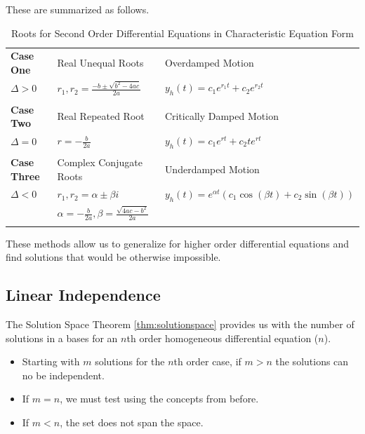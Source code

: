     These are summarized as follows.

        \begin{table}[ht]
            \centering
            \begin{tabular}{| l | l | l |}
                \hline
                \textbf{Case One} & Real Unequal Roots & Overdamped Motion\\
                $\Delta > 0$ & $r_1, r_2 = \frac{-b \pm \sqrt{b^2 - 4ac} }{2a}$ & $y_h(t) = c_1 e^{r_1 t} + c_2 e^{r_2 t}$\\&&\\
                \hline
                \textbf{Case Two} & Real Repeated Root & Critically Damped Motion\\
                $\Delta = 0$ & $r = - \frac{b}{2a} $ & $y_h(t) = c_1 e^{r t} + c_2 t e^{r t}$\\&&\\
                \hline
                \textbf{Case Three} & Complex Conjugate Roots & Underdamped Motion\\
                $\Delta < 0$ & $r_1, r_2 = \alpha \pm \beta i$ & $y_h(t) = e^{\alpha t} \left( c_1 \cos \left(\beta t \right) + c_2 \sin \left( \beta t \right) \right)$\\
                & $\alpha = - \frac{b}{2a}, \beta = \frac{\sqrt{4ac - b^2} }{2a}$ &\\&&\\
                \hline
            \end{tabular}
            \caption{Roots for Second Order Differential Equations in Characteristic Equation Form}
            \label{table:roots}
        \end{table}

    These methods allow us to generalize for higher order differential equations and find solutions that would be otherwise impossible.

    \subsection{Linear Independence}
    The Solution Space Theorem \eqref{thm:solutionspace} provides us with the number of solutions in a bases for an $n$th order homogeneous differential equation ($n$).

    \begin{itemize}
        \item Starting with $m$ solutions for the $n$th order case, if $m > n$ the solutions can no be independent.
        \item If $m=n$, we must test using the concepts from before.
        \item If $m < n$, the set does not span the space.
    \end{itemize}

